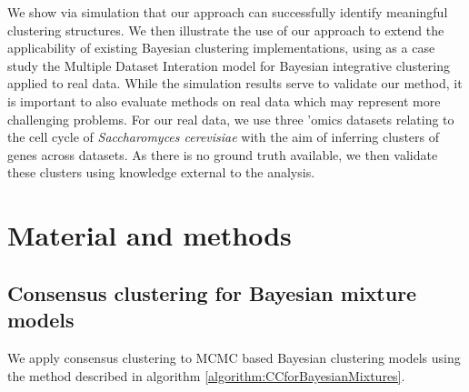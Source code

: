\documentclass{bmcart}
\begin{document}
	We show via simulation that our approach can successfully identify meaningful clustering structures. We then illustrate the use of our approach to extend the applicability of existing Bayesian clustering implementations, using as a case study the Multiple Dataset Interation \citep[\textbf{MDI};][]{kirk2012bayesian} model for Bayesian integrative clustering applied to real data. While the simulation results serve to validate our method, it is important to also evaluate methods on real data which may represent more challenging problems. For our real data, we use three 'omics datasets relating to the cell cycle of \emph{Saccharomyces cerevisiae} with the aim of inferring clusters of genes across datasets. As there is no ground truth available, we then validate these clusters using knowledge external to the analysis. 
	
	\section*{Material and methods}
	
	\subsection*{Consensus clustering for Bayesian mixture models} \label{sec:methodsCC}
	We apply consensus clustering to MCMC based Bayesian clustering models using the method described in algorithm \ref{algorithm:CCforBayesianMixtures}.
	
\end{document}
